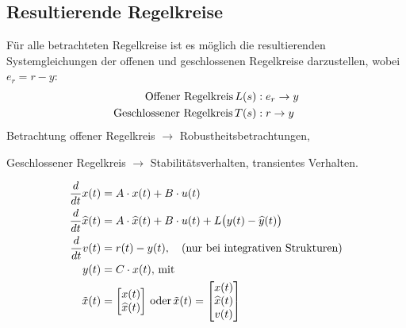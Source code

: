 \subsection{Resultierende Regelkreise}
    Für alle betrachteten Regelkreise ist es möglich die resultierenden Systemgleichungen der offenen und geschlossenen Regelkreise darzustellen, wobei $e_r = r-y$:
    \begin{align*}
        \textnormal{Offener Regelkreis}\, L(s) &: e_r \rightarrow y\\
        \textnormal{Geschlossener Regelkreis}\, T(s) &: r \rightarrow y\\
    \end{align*}
    Betrachtung offener Regelkreis $\rightarrow$ Robustheitsbetrachtungen,
    
    Geschlossener Regelkreis $\rightarrow$ Stabilitätsverhalten, transientes Verhalten.
    
    \begin{align*}
        \frac{d}{dt}x(t) &= A\cdot x(t) + B\cdot u(t)\\
        \frac{d}{dt}\widehat{x}(t) &= A\cdot \widehat{x}(t) + B\cdot u(t) + L\big(y(t)-\widehat{y}(t)\big)\\
        \frac{d}{dt}v(t) &= r(t) - y(t),\quad\textnormal{(nur bei integrativen Strukturen)}\\
        y(t) &= C\cdot x(t),\,\textnormal{mit}\\
        \Tilde{x}(t) &=\begin{bmatrix}x(t)\\\widehat{x}(t)\end{bmatrix}\,\textnormal{oder}\, \Tilde{x}(t) =\begin{bmatrix}x(t)\\\widehat{x}(t)\\v(t)\end{bmatrix}
    \end{align*}
    
